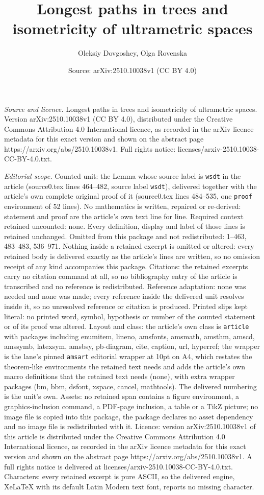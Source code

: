 \documentclass[10pt,a4paper]{amsart}
\title[Longest paths in trees and isometricity of ultrametric space]{Longest paths in trees and isometricity of ultrametric spaces}
\author{Oleksiy Dovgoshey, Olga Rovenska}
\date{Source: arXiv:2510.10038v1 (CC BY 4.0)}
\begin{document}
\maketitle

\noindent\emph{Source and licence.} Longest paths in trees and isometricity of ultrametric spaces. Version arXiv:2510.10038v1 (CC BY 4.0), distributed under the Creative Commons Attribution 4.0 International licence, as recorded in the arXiv licence metadata for this exact version and shown on the abstract page https://arxiv.org/abs/2510.10038v1. Full rights notice: licenses/arxiv-2510.10038-CC-BY-4.0.txt.\par\smallskip

\noindent\textit{Editorial scope.} Counted unit: the Lemma whose source label is \texttt{wsdt} in the article (source0.tex lines 464--482, source label \texttt{wsdt}), delivered together with the article's own complete original proof of it (source0.tex lines 484--535, one \texttt{proof} environment of 52 lines). No mathematics is written, repaired or re-derived: statement and proof are the article's own text line for line. Required context retained uncounted: none. Every definition, display and label of those lines is retained unchanged. Omitted from this package and not redistributed: 1--463, 483--483, 536--971. Nothing inside a retained excerpt is omitted or altered: every retained body is delivered exactly as the article's lines are written, so no omission receipt of any kind accompanies this package. Citations: the retained excerpts carry no citation command at all, so no bibliography entry of the article is transcribed and no reference is redistributed. Reference adaptation: none was needed and none was made; every reference inside the delivered unit resolves inside it, so no unresolved reference or citation is produced. Printed slips kept literal: no printed word, symbol, hypothesis or number of the counted statement or of its proof was altered. Layout and class: the article's own class is \texttt{article} with packages including enumitem, lineno, amsfonts, amsmath, amsthm, amscd, amssymb, latexsym, amsbsy, pb-diagram, cite, caption, url, hyperref; the wrapper is the lane's pinned \texttt{amsart} editorial wrapper at 10pt on A4, which restates the theorem-like environments the retained text needs and adds the article's own macro definitions that the retained text needs (none), with extra wrapper packages (bm, bbm, dsfont, xspace, cancel, mathtools). The delivered numbering is the unit's own. Assets: no retained span contains a figure environment, a graphics-inclusion command, a PDF-page inclusion, a table or a TikZ picture; no image file is copied into this package, the package declares no asset dependency and no image file is redistributed with it. Licence: version arXiv:2510.10038v1 of this article is distributed under the Creative Commons Attribution 4.0 International licence, as recorded in the arXiv licence metadata for this exact version and shown on the abstract page https://arxiv.org/abs/2510.10038v1. A full rights notice is delivered at licenses/arxiv-2510.10038-CC-BY-4.0.txt. Characters: every retained excerpt is pure ASCII, so the delivered engine, XeLaTeX with its default Latin Modern text font, reports no missing character.
\end{document}
